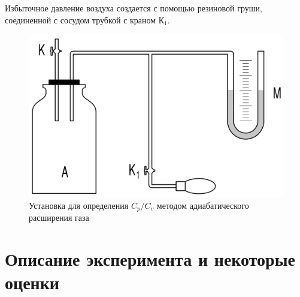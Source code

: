 \documentclass[a4paper,12pt]{article}
\theoremstyle{plain} %
\theoremstyle{definition} %
\theoremstyle{remark} %
\begin{document}
	Избыточное давление воздуха создается с помощью резиновой груши, соединенной с сосудом трубкой с краном $\text{К}_1$. 
	\begin{figure}[H]
		\begin{center}
			\includegraphics[width=0.7\linewidth]{1}
					\captionsetup{justification=centering}
			\caption{Установка для определения $C_p/C_v$ методом адиабатического расширения газа}
		\end{center}
	\end{figure}
\section{Описание эксперимента и некоторые оценки}
\end{document}
